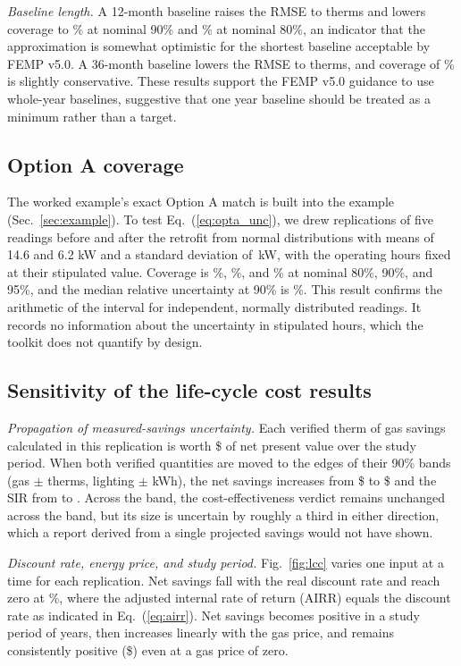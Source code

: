 \emph{Baseline length.} A 12-month baseline raises the RMSE to \RmseYrOne{} therms and lowers coverage to \CovYrOne\% at nominal 90\% and \CovYrOneEighty\% at nominal 80\%, an indicator that the approximation is somewhat optimistic for the shortest baseline acceptable by FEMP v5.0. A 36-month baseline lowers the RMSE to \RmseYrThree{} therms, and coverage of \CovYrThree\% is slightly conservative. These results support the FEMP v5.0 guidance to use whole-year baselines, suggestive that one year baseline should be treated as a minimum rather than a target.

\subsection{Option A coverage}\label{sec:val_a}

The worked example's exact Option A match is built into the example (Sec.~\ref{sec:example}). To test Eq.~(\ref{eq:opta_unc}), we drew \OaReps{} replications of five readings before and after the retrofit from normal distributions with means of 14.6 and 6.2 kW and a standard deviation of \OaSd\,kW, with the operating hours fixed at their stipulated value. Coverage is \OaCovEighty\%, \OaCovNinety\%, and \OaCovNinetyFive\% at nominal 80\%, 90\%, and 95\%, and the median relative uncertainty at 90\% is \OaMedRel\%. This result confirms the arithmetic of the interval for independent, normally distributed readings. It records no information about the uncertainty in stipulated hours, which the toolkit does not quantify by design.

\subsection{Sensitivity of the life-cycle cost results}\label{sec:val_lcc}

\emph{Propagation of measured-savings uncertainty.} Each verified therm of gas savings calculated in this replication is worth \$\NsPerTherm{} of net present value over the study period. When both verified quantities are moved to the edges of their 90\% bands (gas $\pm$\AbsUnc{} therms, lighting $\pm$\OptAUnc{} kWh), the net savings increases from \$\NsLow{} to \$\NsHigh{} and the SIR from \SirLow{} to \SirHigh. Across the band, the cost-effectiveness verdict remains unchanged across the band, but its size is uncertain by roughly a third in either direction, which a report derived from a single projected savings would not have shown.

\emph{Discount rate, energy price, and study period.} Fig.~\ref{fig:lcc} varies one input at a time for each replication. Net savings fall with the real discount rate and reach zero at \BeRate\%, where the adjusted internal rate of return (AIRR) equals the discount rate as indicated in Eq.~(\ref{eq:airr}). Net savings becomes positive in a study period of \BeYears{} years, then increases linearly with the gas price, and remains consistently positive (\$\NsZeroGas) even at a gas price of zero.

